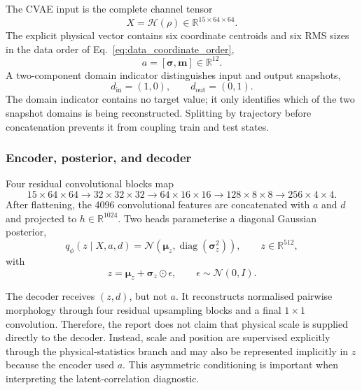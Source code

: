 The CVAE input is the complete channel tensor
\begin{equation}
    X=\mathcal{H}(\rho)\in\mathbb{R}^{15\times64\times64}.
\end{equation}
The explicit physical vector contains six coordinate centroids and six RMS sizes in the data order of Eq.~\eqref{eq:data_coordinate_order},
\begin{equation}
    a
    =
    [\bm\sigma,\bm m]
    \in
    \mathbb{R}^{12}.
\end{equation}
A two-component domain indicator distinguishes input and output snapshots,
\begin{equation}
    d_{\mathrm{in}}=(1,0),
    \qquad
    d_{\mathrm{out}}=(0,1).
\end{equation}
The domain indicator contains no target value; it only identifies which of the two snapshot domains is being reconstructed. Splitting by trajectory before concatenation prevents it from coupling train and test states.

\subsubsection{Encoder, posterior, and decoder}

Four residual convolutional blocks map
\begin{equation}
    15\times64\times64
    \longrightarrow
    32\times32\times32
    \longrightarrow
    64\times16\times16
    \longrightarrow
    128\times8\times8
    \longrightarrow
    256\times4\times4.
    \label{eq:cvae_encoder_shapes}
\end{equation}
After flattening, the 4096 convolutional features are concatenated with $a$ and $d$ and projected to $h\in\mathbb{R}^{1024}$. Two heads parameterise a diagonal Gaussian posterior,
\begin{equation}
    q_{\phi}(z\mid X,a,d)
    =
    \mathcal{N}\!\left(
        \bm\mu_z,
        \operatorname{diag}(\bm\sigma_z^2)
    \right),
    \qquad
    z\in\mathbb{R}^{512},
    \label{eq:cvae_posterior}
\end{equation}
with
\begin{equation}
    z
    =
    \bm\mu_z
    +
    \bm\sigma_z\odot\epsilon,
    \qquad
    \epsilon\sim\mathcal{N}(0,I).
    \label{eq:cvae_reparameterisation}
\end{equation}

The decoder receives $(z,d)$, but not $a$. It reconstructs normalised pairwise morphology through four residual upsampling blocks and a final $1\times1$ convolution. Therefore, the report does not claim that physical scale is supplied directly to the decoder. Instead, scale and position are supervised explicitly through the physical-statistics branch and may also be represented implicitly in $z$ because the encoder used $a$. This asymmetric conditioning is important when interpreting the latent-correlation diagnostic.

